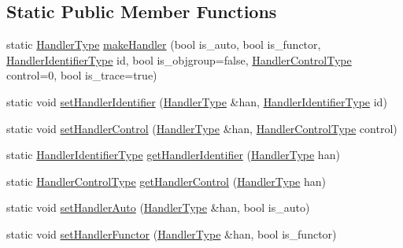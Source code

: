 \subsection*{Static Public Member Functions}
\begin{DoxyCompactItemize}
\item 
static \hyperlink{namespacevt_af64846b57dfcaf104da3ef6967917573}{Handler\+Type} \hyperlink{structvt_1_1_handler_manager_adfeeb7560bf9cd5fda887fdf11902f4e}{make\+Handler} (bool is\+\_\+auto, bool is\+\_\+functor, \hyperlink{namespacevt_a59ae068fe828d1c33051ff96f3d016b6}{Handler\+Identifier\+Type} id, bool is\+\_\+objgroup=false, \hyperlink{namespacevt_adbbef13b92f0a93b14c219b7cc8a48f2}{Handler\+Control\+Type} control=0, bool is\+\_\+trace=true)
\item 
static void \hyperlink{structvt_1_1_handler_manager_a5501e67dbd88836fecdf434548de0909}{set\+Handler\+Identifier} (\hyperlink{namespacevt_af64846b57dfcaf104da3ef6967917573}{Handler\+Type} \&han, \hyperlink{namespacevt_a59ae068fe828d1c33051ff96f3d016b6}{Handler\+Identifier\+Type} id)
\item 
static void \hyperlink{structvt_1_1_handler_manager_a8cfa04599d2bd111f1197b7bf2343a05}{set\+Handler\+Control} (\hyperlink{namespacevt_af64846b57dfcaf104da3ef6967917573}{Handler\+Type} \&han, \hyperlink{namespacevt_adbbef13b92f0a93b14c219b7cc8a48f2}{Handler\+Control\+Type} control)
\item 
static \hyperlink{namespacevt_a59ae068fe828d1c33051ff96f3d016b6}{Handler\+Identifier\+Type} \hyperlink{structvt_1_1_handler_manager_a1fc8635a26795f11f16f47eaf74b25a7}{get\+Handler\+Identifier} (\hyperlink{namespacevt_af64846b57dfcaf104da3ef6967917573}{Handler\+Type} han)
\item 
static \hyperlink{namespacevt_adbbef13b92f0a93b14c219b7cc8a48f2}{Handler\+Control\+Type} \hyperlink{structvt_1_1_handler_manager_a90bf2b080d44af243e5a35bf8836d161}{get\+Handler\+Control} (\hyperlink{namespacevt_af64846b57dfcaf104da3ef6967917573}{Handler\+Type} han)
\item 
static void \hyperlink{structvt_1_1_handler_manager_a9100f9e0e946b58d98d104a5cbcf5574}{set\+Handler\+Auto} (\hyperlink{namespacevt_af64846b57dfcaf104da3ef6967917573}{Handler\+Type} \&han, bool is\+\_\+auto)
\item 
static void \hyperlink{structvt_1_1_handler_manager_a25c8a39b9faea3e894021d5c6d52f903}{set\+Handler\+Functor} (\hyperlink{namespacevt_af64846b57dfcaf104da3ef6967917573}{Handler\+Type} \&han, bool is\+\_\+functor)
\item 

\end{DoxyCompactItemize}
